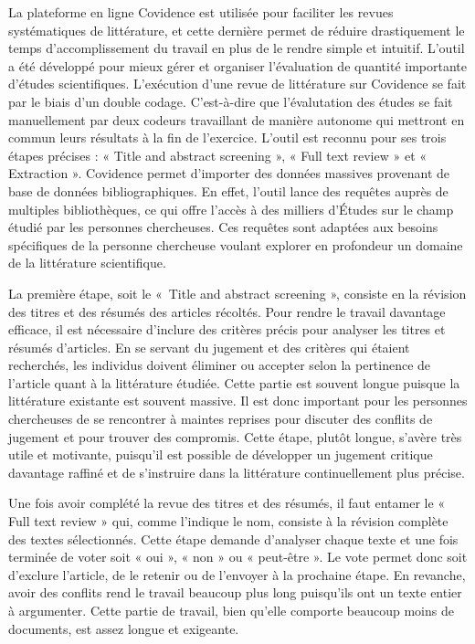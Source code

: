 \documentclass[
  letterpaper,
]{scrbook}
\begin{document}
La plateforme en ligne Covidence est utilisée pour faciliter les revues
systématiques de littérature, et cette dernière permet de réduire
drastiquement le temps d'accomplissement du travail en plus de le rendre
simple et intuitif. L'outil a été développé pour mieux gérer et
organiser l'évaluation de quantité importante d'études scientifiques.
L'exécution d'une revue de littérature sur Covidence se fait par le
biais d'un double codage. C'est-à-dire que l'évalutation des études se
fait manuellement par deux codeurs travaillant de manière autonome qui
mettront en commun leurs résultats à la fin de l'exercice. L'outil est
reconnu pour ses trois étapes précises : « Title and abstract screening
», « Full text review » et « Extraction ». Covidence permet d'importer
des données massives provenant de base de données bibliographiques. En
effet, l'outil lance des requêtes auprès de multiples bibliothèques, ce
qui offre l'accès à des milliers d'Études sur le champ étudié par les
personnes chercheuses. Ces requêtes sont adaptées aux besoins
spécifiques de la personne chercheuse voulant explorer en profondeur un
domaine de la littérature scientifique.

La première étape, soit le «~Title and abstract screening », consiste en
la révision des titres et des résumés des articles récoltés. Pour rendre
le travail davantage efficace, il est nécessaire d'inclure des critères
précis pour analyser les titres et résumés d'articles. En se servant du
jugement et des critères qui étaient recherchés, les individus doivent
éliminer ou accepter selon la pertinence de l'article quant à la
littérature étudiée. Cette partie est souvent longue puisque la
littérature existante est souvent massive. Il est donc important pour
les personnes chercheuses de se rencontrer à maintes reprises pour
discuter des conflits de jugement et pour trouver des compromis. Cette
étape, plutôt longue, s'avère très utile et motivante, puisqu'il est
possible de développer un jugement critique davantage raffiné et de
s'instruire dans la littérature continuellement plus précise.

Une fois avoir complété la revue des titres et des résumés, il faut
entamer le « Full text review » qui, comme l'indique le nom, consiste à
la révision complète des textes sélectionnés. Cette étape demande
d'analyser chaque texte et une fois terminée de voter soit « oui », «
non » ou « peut-être ». Le vote permet donc soit d'exclure l'article, de
le retenir ou de l'envoyer à la prochaine étape. En revanche, avoir des
conflits rend le travail beaucoup plus long puisqu'ils ont un texte
entier à argumenter. Cette partie de travail, bien qu'elle comporte
beaucoup moins de documents, est assez longue et exigeante.
\end{document}
